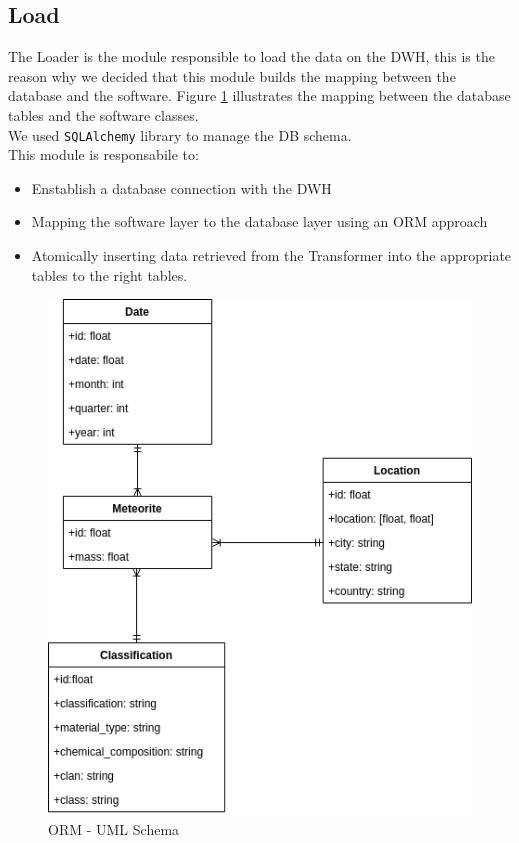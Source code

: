 \documentclass[conference]{IEEEtran}
\begin{document}
	\subsection{Load}
	The Loader is the module responsible to load the data on the DWH, this is the reason why we decided that this module builds the mapping between the database and the software. Figure \ref{fig: ORM_mapping} illustrates the mapping between the database tables and the software classes.\\ We used \texttt{SQLAlchemy} library to manage the DB schema.\\ This module is responsabile to:
	\begin{itemize}
		\item Enstablish a database connection with the DWH
		\item Mapping the software layer to the database layer using an ORM approach
		\item Atomically inserting data retrieved from the Transformer into the appropriate tables to the right tables.
	\end{itemize}
	
	\begin{figure}[htpb]
		\centering
		\includegraphics[width=\columnwidth]{images/uml_schema.png}
		\caption{ORM - UML Schema}
		\label{fig: ORM_mapping}
	\end{figure}
		
\end{document}
